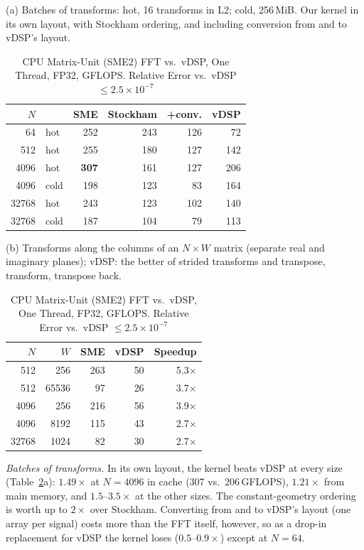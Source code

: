 \documentclass[conference]{IEEEtran}
\newcommand{\GF}{\,GFLOPS}
\begin{document}
\begin{table}[t]
\centering
\caption{CPU Matrix-Unit (SME2) FFT vs.\ vDSP, One Thread, FP32, GFLOPS. Relative Error vs.\ vDSP
$\le2.5\times10^{-7}$}
\label{tab:sme}
\footnotesize
(a) Batches of transforms: hot, 16 transforms in L2; cold, 256\,MiB. Our kernel in its own layout,
with Stockham ordering, and including conversion from and to vDSP's layout.\\[2pt]
\begin{tabular}{@{}rlrrrr@{}}
\toprule
\textbf{$N$} & & \textbf{SME} & \textbf{Stockham} & \textbf{+conv.} & \textbf{vDSP} \\
\midrule
64 & hot & 252 & 243 & 126 & 72 \\
512 & hot & 255 & 180 & 127 & 142 \\
4096 & hot & \textbf{307} & 161 & 127 & 206 \\
4096 & cold & 198 & 123 & 83 & 164 \\
32768 & hot & 243 & 123 & 102 & 140 \\
32768 & cold & 187 & 104 & 79 & 113 \\
\bottomrule
\end{tabular}

\medskip
(b) Transforms along the columns of an $N\times W$ matrix (separate real and imaginary planes); vDSP:
the better of strided transforms and transpose, transform, transpose back.\\[2pt]
\begin{tabular}{@{}rrrrr@{}}
\toprule
\textbf{$N$} & \textbf{$W$} & \textbf{SME} & \textbf{vDSP} & \textbf{Speedup} \\
\midrule
512 & 256 & 263 & 50 & 5.3$\times$ \\
512 & 65536 & 97 & 26 & 3.7$\times$ \\
4096 & 256 & 216 & 56 & 3.9$\times$ \\
4096 & 8192 & 115 & 43 & 2.7$\times$ \\
32768 & 1024 & 82 & 30 & 2.7$\times$ \\
\bottomrule
\end{tabular}
\end{table}

\textit{Batches of transforms.} In its own layout, the kernel beats vDSP at every size
(Table~\ref{tab:sme}a): $1.49\times$ at $N=4096$ in cache (307 vs.\ 206\GF{}), $1.21\times$ from main
memory, and $1.5$--$3.5\times$ at the other sizes. The constant-geometry ordering is worth up to
$2\times$ over Stockham. Converting from and to vDSP's layout (one array per signal) costs more than the
FFT itself, however, so as a drop-in replacement for vDSP the kernel loses ($0.5$--$0.9\times$) except at
$N=64$.
\end{document}
